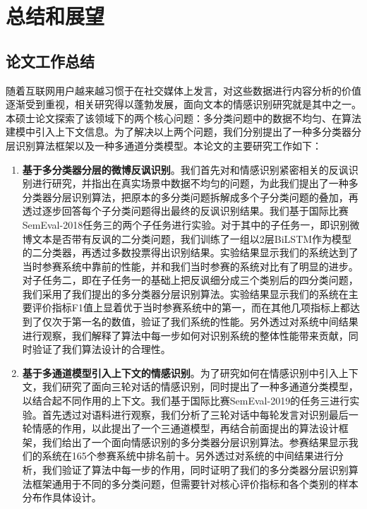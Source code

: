 \chapter{总结和展望}
\label{cha:conclusion}

\section{论文工作总结}

随着互联网用户越来越习惯于在社交媒体上发言，对这些数据进行内容分析的价值逐渐受到重视，相关研究得以蓬勃发展，面向文本的情感识别研究就是其中之一。本硕士论文探索了该领域下的两个核心问题：多分类问题中的数据不均匀、在算法建模中引入上下文信息。为了解决以上两个问题，我们分别提出了一种多分类器分层识别算法框架以及一种多通道分类模型。本论文的主要研究工作如下：

\begin{enumerate}

\item {\bf 基于多分类器分层的微博反讽识别}。我们首先对和情感识别紧密相关的反讽识别进行研究，并指出在真实场景中数据不均匀的问题，为此我们提出了一种多分类器分层识别算法，把原本的多分类问题拆解成多个子分类问题的叠加，再透过逐步回答每个子分类问题得出最终的反讽识别结果。我们基于国际比赛SemEval-2018任务三的两个子任务进行实验。对于其中的子任务一，即识别微博文本是否带有反讽的二分类问题，我们训练了一组以2层BiLSTM作为模型的二分类器，再透过多数投票得出识别结果。实验结果显示我们的系统达到了当时参赛系统中靠前的性能，并和我们当时参赛的系统对比有了明显的进步。对子任务二，即在子任务一的基础上把反讽细分成三个类别后的四分类问题，我们采用了我们提出的多分类器分层识别算法。实验结果显示我们的系统在主要评价指标F1值上显着优于当时参赛系统中的第一，而在其他几项指标上都达到了仅次于第一名的数值，验证了我们系统的性能。另外透过对系统中间结果进行观察，我们解释了算法中每一步如何对识别系统的整体性能带来贡献，同时验证了我们算法设计的合理性。

\item {\bf 基于多通道模型引入上下文的情感识别}。为了研究如何在情感识别中引入上下文，我们研究了面向三轮对话的情感识别，同时提出了一种多通道分类模型，以结合起不同作用的上下文。我们基于国际比赛SemEval-2019的任务三进行实验。首先透过对语料进行观察，我们分析了三轮对话中每轮发言对识别最后一轮情感的作用，以此提出了一个三通道模型，再结合前面提出的算法设计框架，我们给出了一个面向情感识别的多分类器分层识别算法。参赛结果显示我们的系统在165个参赛系统中排名前十。另外透过对系统的中间结果进行分析，我们验证了算法中每一步的作用，同时证明了我们的多分类器分层识别算法框架通用于不同的多分类问题，但需要针对核心评价指标和各个类别的样本分布作具体设计。

\end{enumerate}

